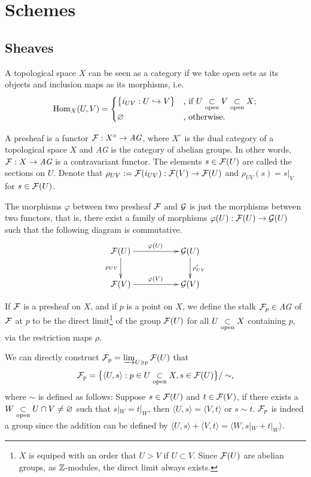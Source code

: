 \documentclass[12pt]{extbook}
\begin{document}
\setcounter{chapter}{1}
\chapter{Schemes}
\section{Sheaves}
\para A topological space $X$ can be seen as a category if we take open sets as its objects and inclusion maps as its morphisms, i.e. 
\[
	\operatorname{Hom}_{X}(U,V)=\begin{cases}
	\bigl\{i_{UV}:U\hookrightarrow V\bigr\}&\text{, if }U\underset{\mathrm{open}}{\subset} V\underset{\mathrm{open}}{\subset} X\text{;}\\
	\varnothing&\text{, otherwise}.
	\end{cases}
\]

\para A presheaf is a functor $\mathcal{F}:X^\circ\to \textit{AG}$, where $X^\circ$ is the dual category of a topological space $X$ and \textit{AG} is the category of abelian groups. In other words, $\mathcal{F}:X\to \textit{AG}$ is a contravariant functor. The elements $s\in \mathcal{F}(U)$ are called the sections on $U$. Denote that $\rho_{UV}:=\mathcal{F}(i_{UV}):\mathcal{F}(V)\to\mathcal{F}(U)$ and $\rho_{UV}(s)=s|_V$ for $s \in \mathcal{F}(U)$.


The morphisms $\varphi$ between two presheaf $\mathcal{F}$ and $\mathcal{G}$ is just the morphisms between two functors, that is, there exist a family of morphisms $\varphi(U):\mathcal{F}(U)\to \mathcal{G}(U)$ such that the following diagram is commutative.
\[
	\xymatrix{
		\calf(U)\ar[rr]^{\varphi(U)} \ar[d]_{\rho_{UV}}&&\calg(U) \ar[d]^{\rho'_{UV}}\\
		\calf(V)\ar[rr]^{\varphi(V)}&&\calg(V)
	}
\]

\para If $\mathcal{F}$ is a presheaf on $X$, and if $p$ is a point on $X$, we define the stalk $\mathcal{F}_p\in \textit{AG}$ of $\mathcal{F}$ at $p$ to be the direct limit\footnote{$X$ is equiped with an order that $U>V$ if $U\subset V$. Since $\mathcal{F}(U)$ are abelian groups, as $\mathbb{Z}$-modules, the direct limit always exists.} of the group $\mathcal{F}(U)$ for all $U \underset{\mathrm{open}}{\subset} X$ containing $p$, via the restriction maps $\rho$.

We can directly construct $\mathcal{F}_p=\varinjlim_{U\ni p}\mathcal{F}(U)$ that 
\[
	\mathcal{F}_p=\bigl\{\langle U,s\rangle: p\in U\underset{\mathrm{open}}{\subset} X, s\in \mathcal{F}(U)\bigr\}/\sim,
\]
where $\sim$ is defined as follows: Suppose $s\in\mathcal{F}(U)$ and $t\in\mathcal{F}(V)$, if there exists a $W\underset{\mathrm{open}}{\subset} U\cap V\neq \varnothing$ such that $s|_W=t|_W$, then $\langle U,s\rangle=\langle V,t\rangle$ or $s\sim t$. $\mathcal{F}_p$ is indeed a group since the addition can be defined by $\langle U,s\rangle+\langle V,t\rangle=\langle W,s|_W+t|_W\rangle$. 
\end{document}
